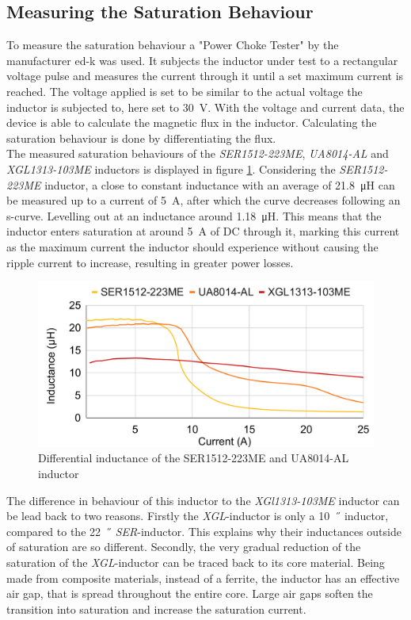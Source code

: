 \subsection{Measuring the Saturation Behaviour}
To measure the saturation behaviour a "Power Choke Tester" by the manufacturer ed-k was used. It subjects the inductor under test to a rectangular voltage pulse and measures the current through it until a set maximum current is reached. The voltage applied is set to be similar to the actual voltage the inductor is subjected to, here set to \SI{30}{V}. With the voltage and current data, the device is able to calculate the magnetic flux in the inductor. Calculating the saturation behaviour is done by differentiating the flux.\\ 

The measured saturation behaviours of the \textit{SER1512-223ME}, \textit{UA8014-AL} and \textit{XGL1313-103ME} inductors is displayed in figure \ref{fig:differential_inductance_of_the_ser1512-223me_inductor}. Considering the \textit{SER1512-223ME} inductor, a close to constant inductance with an average of \SI{21.8}{\micro\henry} can be measured up to a current of \SI{5}{\A}, after which the curve decreases following an s-curve. Levelling out at an inductance around \SI{1.18}{\micro\henry}. This means that the inductor enters saturation at around \SI{5}{\A} of \ac{DC} through it, marking this current as the maximum current the inductor should experience without causing the ripple current to increase, resulting in greater power losses.
\begin{figure}[h]
    \centering
    \includegraphics[width=0.8\linewidth]{Bilder//Kapitel3/SER223_UA_XGL103_Saturation.pdf}
    \caption{Differential inductance of the SER1512-223ME and UA8014-AL inductor}
    \label{fig:differential_inductance_of_the_ser1512-223me_inductor}
\end{figure}
The difference in behaviour of this inductor to the \textit{XGl1313-103ME} inductor can be lead back to two reasons. Firstly the \textit{XGL}-inductor is only a \SI{10}{\micro\H} inductor, compared to the \SI{22}{\micro\H} \textit{SER}-inductor. This explains why their inductances outside of saturation are so different. Secondly, the very gradual reduction of the saturation of the \textit{XGL}-inductor can be traced back to its core material. Being made from composite materials, instead of a ferrite, the inductor has an effective air gap, that is spread throughout the entire core. Large air gaps soften the transition into saturation and increase the saturation current. \\
